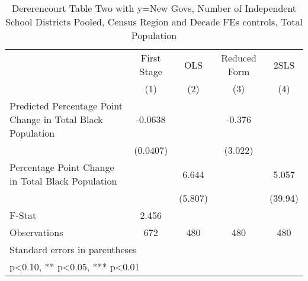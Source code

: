 \begin{table}[htbp]\centering
\def\sym#1{\ifmmode^{#1}\else\(^{#1}\)\fi}
\caption{Dererencourt Table Two with y=New Govs, Number of Independent School Districts  Pooled, Census Region and Decade FEs controls, Total Population}
\begin{tabular}{l*{4}{c}}
\toprule
                    & First Stage   &         OLS   &Reduced Form   &        2SLS   \\
                    &\multicolumn{1}{c}{(1)}   &\multicolumn{1}{c}{(2)}   &\multicolumn{1}{c}{(3)}   &\multicolumn{1}{c}{(4)}   \\
\midrule
Predicted Percentage Point Change in Total Black Population&     -0.0638   &               &      -0.376   &               \\
                    &    (0.0407)   &               &     (3.022)   &               \\
\addlinespace
Percentage Point Change in Total Black Population&               &       6.644   &               &       5.057   \\
                    &               &     (5.807)   &               &     (39.94)   \\
\midrule
F-Stat              &       2.456   &               &               &               \\
Observations        &         672   &         480   &         480   &         480   \\
\bottomrule
\multicolumn{5}{l}{\footnotesize Standard errors in parentheses}\\
\multicolumn{5}{l}{\footnotesize * p<0.10, ** p<0.05, *** p<0.01}\\
\end{tabular}
\end{table}

